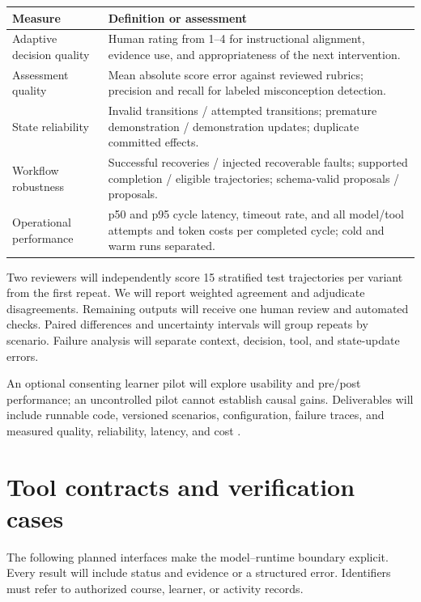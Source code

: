 \documentclass{article}
\begin{document}
\begin{tabular}{@{}>{\raggedright\arraybackslash}p{1.35in}>{\raggedright\arraybackslash}p{3.95in}@{}}
\toprule
\textbf{Measure} & \textbf{Definition or assessment} \\
\midrule
Adaptive decision quality & Human rating from 1--4 for instructional alignment, evidence use, and appropriateness of the next intervention. \\
\addlinespace[3pt]
Assessment quality & Mean absolute score error against reviewed rubrics; precision and recall for labeled misconception detection. \\
\addlinespace[3pt]
State reliability & Invalid transitions / attempted transitions; premature demonstration / demonstration updates; duplicate committed effects. \\
\addlinespace[3pt]
Workflow robustness & Successful recoveries / injected recoverable faults; supported completion / eligible trajectories; schema-valid proposals / proposals. \\
\addlinespace[3pt]
Operational performance & p50 and p95 cycle latency, timeout rate, and all model/tool attempts and token costs per completed cycle; cold and warm runs separated. \\
\bottomrule
\end{tabular}

Two reviewers will independently score 15 stratified test trajectories per variant from the first repeat. We will report weighted agreement and adjudicate disagreements. Remaining outputs will receive one human review and automated checks. Paired differences and uncertainty intervals will group repeats by scenario. Failure analysis will separate context, decision, tool, and state-update errors.

An optional consenting learner pilot will explore usability and pre/post performance; an uncontrolled pilot cannot establish causal gains. Deliverables will include runnable code, versioned scenarios, configuration, failure traces, and measured quality, reliability, latency, and cost \citep{ref1}.

\label{main:end}

\clearpage

\appendix

\section{Tool contracts and verification cases}

The following planned interfaces make the model--runtime boundary explicit. Every result will include status and evidence or a structured error. Identifiers must refer to authorized course, learner, or activity records.
\end{document}
